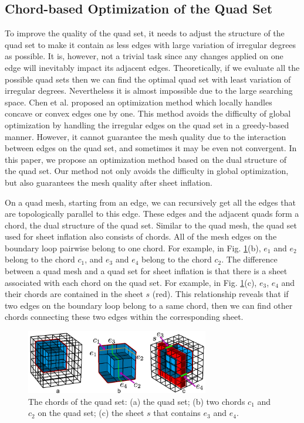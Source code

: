 \documentclass[final,5p,times,twocolumn]{elsarticle}
\begin{document}
\subsection{Chord-based Optimization of the Quad Set}
\label{sec:opt_qs_dual}
To improve the quality of the quad set, it needs to adjust the structure of the quad set to make it contain as less edges with large variation of irregular degrees as possible. It is, however, not a trivial task since any changes applied on one edge will inevitably impact its adjacent edges. Theoretically, if we evaluate all the possible quad sets then we can find the optimal quad set with least variation of irregular degrees. Nevertheless it is almost impossible due to the large searching space. Chen et al. proposed an optimization method which locally handles concave or convex edges one by one\cite{Chen:2015kf}. This method avoids the difficulty of global optimization by handling the irregular edges on the quad set in a greedy-based manner. However, it cannot guarantee the mesh quality due to the interaction between edges on the quad set, and sometimes it may be even not convergent. In this paper, we propose an optimization method based on the dual structure of the quad set. Our method not only avoids the difficulty in global optimization, but also guarantees the mesh quality after sheet inflation.

On a quad mesh, starting from an edge, we can recursively get all the edges that are topologically parallel to this edge. These edges and the adjacent quads form a chord, the dual structure of the quad set\cite{Murdoch:1997fy,Mitchell1996}. Similar to the quad mesh, the quad set used for sheet inflation also consists of chords. All of the mesh edges on the boundary loop pairwise belong to one chord. For example, in Fig. \ref{fig:qs_dual}(b), $e_1$ and $e_2$ belong to the chord $c_1$, and $e_3$ and $e_4$ belong to the chord $c_2$. The difference between a quad mesh and a quad set for sheet inflation is that there is a sheet associated with each chord on the quad set. For example, in Fig. \ref{fig:qs_dual}(c), $e_3$, $e_4$ and their chords are contained in the sheet $s$ (red). This relationship reveals that if two edges on the boundary loop belong to a same chord, then we can find other chords connecting these two edges within the corresponding sheet.

\begin{figure}[htbp]
\begin{center}
\includegraphics[width=8cm]{figures/qs_dual.png}
\caption{The chords of the quad set: (a) the quad set; (b) two chords $c_1$ and $c_2$ on the quad set; (c) the sheet $s$ that contains $e_3$ and $e_4$.}
\label{fig:qs_dual}
\end{center}
\end{figure}
\end{document}
